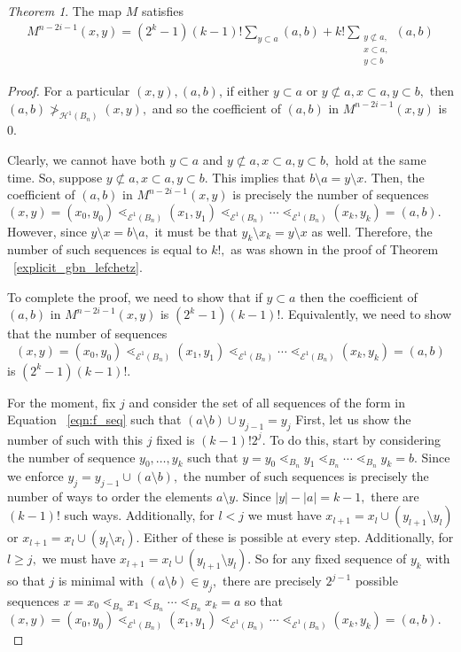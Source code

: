 \documentclass[10 pt]{amsart}
\theoremstyle{plain}
\theoremstyle{definition}
\theoremstyle{remark}
\numberwithin{equation}{section}
\newtheorem{thm}{Theorem}[section]
\theoremstyle{remark}
\begin{document}
\begin{thm}
The map $M$ satisfies 
\begin{align*}
	M^{n-2i-1}(x, y) = (2^k - 1)(k-1)!\sum_{y \subset a}^{}(a, b) +k! \sum_{\substack{{y \not \subset a,}\\{x\subset a,}\\{y \subset b}}}^{}(a, b)
\end{align*}
\end{thm}
\begin{proof}

For a particular $(x, y),(a , b)$, if either $y \subset a$ or $y \not \subset a, x\subset a, y\subset b,$ then $(a, b) \not >_{\mathcal H^1(B_n)} (x, y),$ and so the coefficient of $(a, b)$ in $M^{n-2i-1}(x, y)$ is 0.

Clearly, we cannot have both $y \subset a$ and $y \not \subset a, x\subset a, y\subset b,$ hold at the same time. So, suppose  $y \not \subset a, x\subset a, y\subset b.$ This implies that $b\setminus a = y\setminus x.$ Then, the coefficient of $(a, b)$ in $M^{n-2i-1}(x, y)$ is precisely the number of sequences $(x, y) = (x_0, y_0) \lessdot_{\mathcal E^1(B_n)} (x_1, y_1) \lessdot_{\mathcal E^1(B_n)}  \cdots \lessdot_{\mathcal E^1(B_n)}  (x_k, y_k) = (a, b).$ However, since $y \setminus x = b\setminus a,$ it must be that $y_k \setminus x_k = y\setminus x$ as well. Therefore, the number of such sequences is equal to $k!,$ as was shown in the proof of Theorem ~\ref{explicit_gbn_lefchetz}.

To complete the proof, we need to show that if $y \subset a$ then the coefficient of $(a, b)$ in $M^{n-2i-1}(x, y)$ is $(2^k - 1)(k-1)!$. Equivalently, we need to show that the number of sequences 
\begin{equation}
\label{eqn:f_seq}
(x, y) = (x_0, y_0) \lessdot_{\mathcal E^1(B_n)} (x_1, y_1) \lessdot_{\mathcal E^1(B_n)}  \cdots \lessdot_{\mathcal E^1(B_n)}  (x_k, y_k) = (a, b)
\end{equation}
is $(2^k - 1)(k-1)!.$

For the moment, fix $j$ and consider the set of all sequences of the form in Equation ~\eqref{eqn:f_seq} such that $(a\setminus b) \cup y_{j-1} = y_j$ First, let us show the number of such with this $j$ fixed is $(k-1)!2^j.$ To do this, start by considering the number of sequence $y_0,\ldots, y_k$ such that $y=y_0 \lessdot_{B_n} y_1 \lessdot_{B_n} \cdots \lessdot_{B_n} y_k = b.$ Since we enforce $y_j = y_{j-1} \cup (a \setminus b),$ the number of such sequences is precisely the number of ways to order the elements $a \setminus y.$ Since $|y| - |a| = k-1,$ there are $(k-1)!$ such ways. Additionally, for $l <j$ we must have $x_{l+1} = x_l \cup (y_{l+1} \setminus y_l)$ or $x_{l+1} = x_l \cup (y_l \setminus x_l).$ 
Either of these is possible at every step. Additionally, for $l \geq j,$ we must have $x_{l+1} = x_l \cup (y_{l+1} \setminus y_l).$ So for any fixed sequence of $y_k$ with so that $j$ is minimal with $(a\setminus b) \in y_j,$ 
there are precisely $2^{j-1}$ possible sequences $x=x_0 \lessdot_{B_n} x_1 \lessdot_{B_n} \cdots \lessdot_{B_n} x_k = a$
so that $(x, y) = (x_0, y_0) \lessdot_{\mathcal E^1(B_n)} (x_1, y_1) \lessdot_{\mathcal E^1(B_n)}  \cdots \lessdot_{\mathcal E^1(B_n)}  (x_k, y_k) = (a, b).$


\end{proof}
\end{document}

